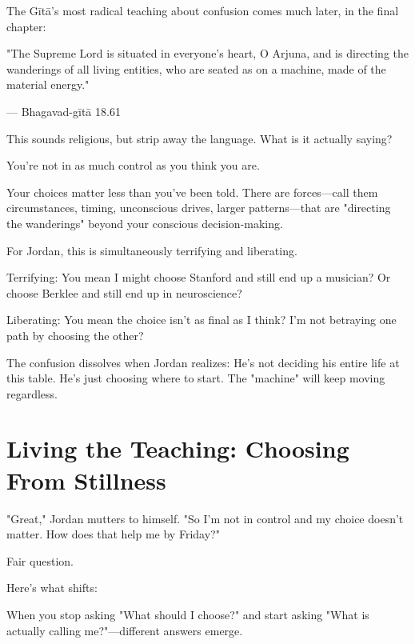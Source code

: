 \documentclass[11pt,twoside]{book}
\begin{document}
The Gītā's most radical teaching about confusion comes much later, in the final chapter:

\begin{pullquote}
"The Supreme Lord is situated in everyone's heart, O Arjuna, and is directing the wanderings of all living entities, who are seated as on a machine, made of the material energy."

--- Bhagavad-gītā 18.61
\end{pullquote}

This sounds religious, but strip away the language. What is it actually saying?

You're not in as much control as you think you are.

Your choices matter less than you've been told. There are forces—call them circumstances, timing, unconscious drives, larger patterns—that are "directing the wanderings" beyond your conscious decision-making.

For Jordan, this is simultaneously terrifying and liberating.

Terrifying: You mean I might choose Stanford and still end up a musician? Or choose Berklee and still end up in neuroscience?

Liberating: You mean the choice isn't as final as I think? I'm not betraying one path by choosing the other?

The confusion dissolves when Jordan realizes: He's not deciding his entire life at this table. He's just choosing where to start. The "machine" will keep moving regardless.

\section*{Living the Teaching: Choosing From Stillness}

"Great," Jordan mutters to himself. "So I'm not in control and my choice doesn't matter. How does that help me by Friday?"

Fair question.

Here's what shifts:

When you stop asking "What should I choose?" and start asking "What is actually calling me?"—different answers emerge.
\end{document}
